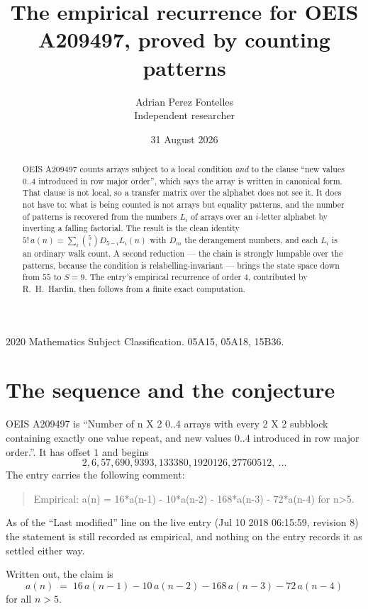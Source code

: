 \documentclass[11pt,a4paper]{article}
\title{The empirical recurrence for OEIS A209497, proved by counting patterns}
\author{Adrian Perez Fontelles\\ \small Independent researcher}
\date{31 August 2026}
\theoremstyle{plain}
\theoremstyle{definition}
\begin{document}
\maketitle

\begin{abstract}
OEIS A209497 counts arrays subject to a local condition \emph{and} to the clause ``new values
$0..4$ introduced in row major order'', which says the array is written in canonical
form. That clause is not local, so a transfer matrix over the alphabet does not see it. It
does not have to: what is being counted is not arrays but equality patterns, and the number
of patterns is recovered from the numbers $L_i$ of arrays over an $i$-letter alphabet by
inverting a falling factorial. The result is the clean identity
$5!\,a(n)=\sum_i\binom{5}{i}D_{5-i}L_i(n)$ with $D_m$ the derangement numbers,
and each $L_i$ is an ordinary walk count. A second reduction --- the chain is strongly
lumpable over the patterns, because the condition is relabelling-invariant --- brings the
state space down from $55$ to $S=9$. The entry's empirical recurrence of order
$4$, contributed by R.~H.~Hardin, then follows from a finite exact computation.
\end{abstract}

\noindent\small 2020 Mathematics Subject Classification. 05A15, 05A18, 15B36.\normalsize

\section{The sequence and the conjecture}

OEIS A209497 is ``Number of n X 2 0..4 arrays with every 2 X 2 subblock containing exactly one value repeat, and new values 0..4 introduced in row major order.''. It has offset $1$ and begins
\[
2, 6, 57, 690, 9393, 133380, 1920126, 27760512,\ \dots
\]
The entry carries the following comment:
\begin{quote}\small
Empirical: a(n) = 16*a(n-1) - 10*a(n-2) - 168*a(n-3) - 72*a(n-4) for n>5.
\end{quote}
As of the ``Last modified'' line on the live entry (Jul 10 2018 06:15:59, revision 8) the statement is
still recorded as empirical, and nothing on the entry records it as settled either way.

Written out, the claim is
\begin{equation}\label{eq:conj}
a(n)\;=\;16\,a(n-1) - 10\,a(n-2) - 168\,a(n-3) - 72\,a(n-4)
\end{equation}
for all $n>5$.
\end{document}
